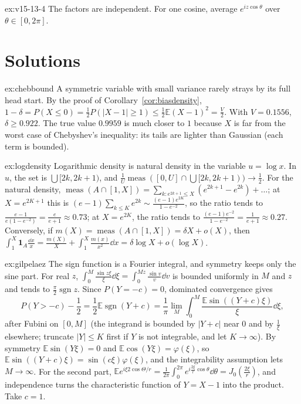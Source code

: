 \begin{hint}{ex:v15-13-4}
The factors are independent. For one cosine, average \(e^{i z\cos\theta}\) over \(\theta\in[0,2\pi]\).
\end{hint}

\section{Solutions}

\begin{solution}{ex:chebbound}
\idea A symmetric variable with small variance rarely strays by its full head start.
\writeup By the proof of Corollary~\ref{cor:biasdensity}, $1-\delta=P(X\le0)=\frac12P(|X-1|\ge1)\le\frac12\mathbb E(X-1)^2=\frac V2$. With $V=0.1556$, $\delta\ge0.922$. The true value $0.9959$ is much closer to $1$ because $X$ is far from the worst case of Chebyshev's inequality: its tails are lighter than Gaussian (each term is bounded).
\end{solution}

\begin{solution}{ex:logdensity}
\idea Logarithmic density is natural density in the variable $u=\log x$.
\writeup In $u$, the set is $\bigcup[2k,2k+1)$, and $\frac1U\operatorname{meas}([0,U]\cap\bigcup[2k,2k+1))\to\frac12$. For the natural density, $\operatorname{meas}(A\cap[1,X])=\sum_{k:e^{2k+1}\le X}(e^{2k+1}-e^{2k})+\dots$; at $X=e^{2K+1}$ this is $(e-1)\sum_{k\le K}e^{2k}\sim\frac{(e-1)e^{2K}}{1-e^{-2}}$, so the ratio tends to $\frac{e-1}{e(1-e^{-2})}=\frac e{e+1}\approx0.73$; at $X=e^{2K}$, the ratio tends to $\frac{(e-1)e^{-2}}{1-e^{-2}}=\frac1{e+1}\approx0.27$. Conversely, if $m(X)=\operatorname{meas}(A\cap[1,X])=\delta X+o(X)$, then $\int_1^X\mathbf 1_A\frac{\dd x}x=\frac{m(X)}X+\int_1^X\frac{m(x)}{x^2}\dd x=\delta\log X+o(\log X)$.
\end{solution}

\begin{solution}{ex:gilpelaez}
\idea The sign function is a Fourier integral, and symmetry keeps only the sine part.
\writeup For real $z$, $\int_0^M\frac{\sin z\xi}\xi\dd\xi=\int_0^{Mz}\frac{\sin v}v\dd v$ is bounded uniformly in $M$ and $z$ and tends to $\frac\pi2\operatorname{sgn}z$. Since $P(Y=-c)=0$, dominated convergence gives
\[
P(Y>-c)-\frac12=\frac12\mathbb E\operatorname{sgn}(Y+c)=\frac1\pi\lim_M\int_0^M\frac{\mathbb E\sin((Y+c)\xi)}\xi\dd\xi,
\]
after Fubini on $[0,M]$ (the integrand is bounded by $|Y+c|$ near $0$ and by $\frac1\xi$ elsewhere; truncate $|Y|\le K$ first if $Y$ is not integrable, and let $K\to\infty$). By symmetry $\mathbb E\sin(Y\xi)=0$ and $\mathbb E\cos(Y\xi)=\varphi(\xi)$, so $\mathbb E\sin((Y+c)\xi)=\sin(c\xi)\varphi(\xi)$, and the integrability assumption lets $M\to\infty$. For the second part, $\mathbb Ee^{i\xi2\cos\Theta/r}=\frac1{2\pi}\int_0^{2\pi}e^{i\frac{2\xi}r\cos\theta}\dd\theta=J_0(\frac{2\xi}r)$, and independence turns the characteristic function of $Y=X-1$ into the product. Take $c=1$.
\end{solution}

